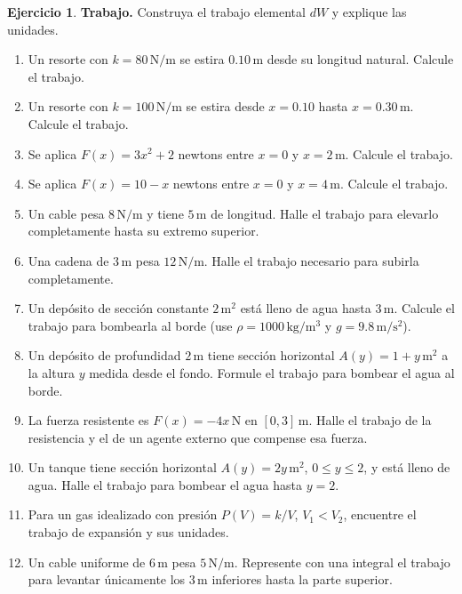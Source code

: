 \documentclass[12pt]{article}
\theoremstyle{definition}
\newtheorem{Ejer}[teorema]{Ejercicio}
\theoremstyle{remark}
\begin{document}
\begin{Ejer}\textbf{Trabajo.} Construya el trabajo elemental $dW$ y explique las unidades.
\begin{enumerate}[resume=banco3]
\item Un resorte con $k=80\,\mathrm{N/m}$ se estira $0.10\,\mathrm m$ desde su longitud natural. Calcule el trabajo.
\item Un resorte con $k=100\,\mathrm{N/m}$ se estira desde $x=0.10$ hasta $x=0.30\,\mathrm m$. Calcule el trabajo.
\item Se aplica $F(x)=3x^2+2$ newtons entre $x=0$ y $x=2\,\mathrm m$. Calcule el trabajo.
\item Se aplica $F(x)=10-x$ newtons entre $x=0$ y $x=4\,\mathrm m$. Calcule el trabajo.
\item Un cable pesa $8\,\mathrm{N/m}$ y tiene $5\,\mathrm m$ de longitud. Halle el trabajo para elevarlo completamente hasta su extremo superior.
\item Una cadena de $3\,\mathrm m$ pesa $12\,\mathrm{N/m}$. Halle el trabajo necesario para subirla completamente.
\item Un depósito de sección constante $2\,\mathrm{m}^2$ está lleno de agua hasta $3\,\mathrm m$. Calcule el trabajo para bombearla al borde (use $\rho=1000\,\mathrm{kg/m^3}$ y $g=9.8\,\mathrm{m/s^2}$).
\item Un depósito de profundidad $2\,\mathrm m$ tiene sección horizontal $A(y)=1+y\,\mathrm{m}^2$ a la altura $y$ medida desde el fondo. Formule el trabajo para bombear el agua al borde.
\item La fuerza resistente es $F(x)=-4x\,\mathrm N$ en $[0,3]\,\mathrm m$. Halle el trabajo de la resistencia y el de un agente externo que compense esa fuerza.
\item Un tanque tiene sección horizontal $A(y)=2y\,\mathrm{m^2}$, $0\le y\le2$, y está lleno de agua. Halle el trabajo para bombear el agua hasta $y=2$.
\item Para un gas idealizado con presión $P(V)=k/V$, $V_1<V_2$, encuentre el trabajo de expansión y sus unidades.
\item Un cable uniforme de $6\,\mathrm m$ pesa $5\,\mathrm{N/m}$. Represente con una integral el trabajo para levantar únicamente los $3\,\mathrm m$ inferiores hasta la parte superior.
\end{enumerate}
\end{Ejer}
\end{document}
